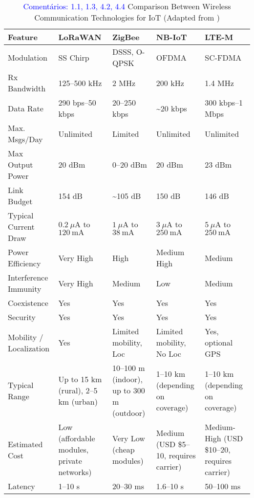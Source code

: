 \documentclass{ieeeaccess}
\begin{document}
\begin{table*}[htbp]
\caption{\textcolor{blue}{Comentários: 1.1, 1.3, 4.2, 4.4} Comparison Between Wireless Communication Technologies for IoT (Adapted from \cite{ansari2021review, ieee802154, maldonado2021})}
\label{tab:comparison}

\begin{tabular}{p{85pt} p{90pt} p{90pt} p{90pt} p{90pt}}
\toprule
\textbf{Feature} & 
\textbf{LoRaWAN} & 
\textbf{ZigBee} & 
\textbf{NB-IoT} & 
\textbf{LTE-M} \\
\toprule
Modulation & 
SS Chirp & 
DSSS, O-QPSK & 
OFDMA & 
SC-FDMA \\

Rx Bandwidth & 
125–500 kHz & 
2 MHz & 
200 kHz & 
1.4 MHz \\

Data Rate & 
290 bps–50 kbps & 
20–250 kbps & 
\textasciitilde20 kbps & 
300 kbps–1 Mbps \\

Max. Msgs/Day & 
Unlimited & 
Limited & 
Unlimited & 
Unlimited \\

Max Output Power & 
20 dBm & 
0–20 dBm & 
20 dBm & 
23 dBm \\

Link Budget & 
154 dB & 
\textasciitilde105 dB & 
150 dB & 
146 dB \\

Typical Current Draw & 
$0.2~\mu\text{A}$ to $120~\text{mA}$ & 
$1~\mu\text{A}$ to $38~\text{mA}$ & 
$3~\mu\text{A}$ to $250~\text{mA}$ & 
$5~\mu\text{A}$ to $250~\text{mA}$ \\

Power Efficiency & 
Very High & 
High & 
Medium High & 
Medium \\

Interference Immunity & 
Very High & 
Medium & 
Low & 
Medium \\

Coexistence & 
Yes & 
Yes & 
Yes & 
Yes \\

Security & 
Yes & 
Yes & 
Yes & 
Yes \\

Mobility / Localization & 
Yes & 
Limited mobility, Loc & 
Limited mobility, No Loc & 
Yes, optional GPS \\

Typical Range & 
Up to 15 km (rural), 2–5 km (urban) & 
10–100 m (indoor), up to 300 m (outdoor) & 
1–10 km (depending on coverage) & 
1–10 km (depending on coverage) \\

Estimated Cost & 
Low (affordable modules, private networks) & 
Very Low (cheap modules) & 
Medium (USD \$5–10, requires carrier) & 
Medium-High (USD \$10–20, requires carrier) \\

Latency & 
1–10 s & 
20–30 ms & 
1.6–10 s & 
50–100 ms \\
\bottomrule
\end{tabular}
\end{table*}
\end{document}
